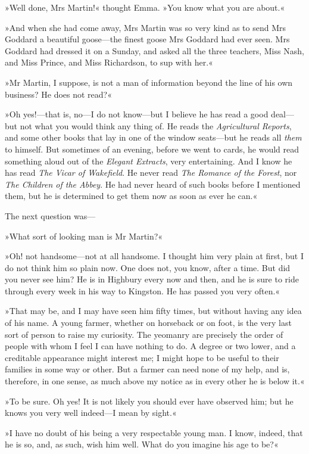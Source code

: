 »Well done, Mrs Martin!« thought Emma. »You know what you are about.«

»And when she had come away, Mrs Martin was so very kind as to send Mrs Goddard a beautiful goose—the finest goose Mrs Goddard had ever seen. Mrs Goddard had dressed it on a Sunday, and asked all the three teachers, Miss Nash, and Miss Prince, and Miss Richardson, to sup with her.«

»Mr Martin, I suppose, is not a man of information beyond the line of his own business? He does not read?«

»Oh yes!—that is, no—I do not know—but I believe he has read a good deal—but not what you would think any thing of. He reads the \textit{Agricultural Reports}, and some other books that lay in one of the window seats—but he reads all \textit{them} to himself. But sometimes of an evening, before we went to cards, he would read something aloud out of the \textit{Elegant Extracts}, very entertaining. And I know he has read \textit{The Vicar of Wakefield}. He never read \textit{The Romance of the Forest}, nor \textit{The Children of the Abbey}. He had never heard of such books before I mentioned them, but he is determined to get them now as soon as ever he can.«

The next question was—

»What sort of looking man is Mr Martin?«

»Oh! not handsome—not at all handsome. I thought him very plain at first, but I do not think him so plain now. One does not, you know, after a time. But did you never see him? He is in Highbury every now and then, and he is sure to ride through every week in his way to Kingston. He has passed you very often.«

»That may be, and I may have seen him fifty times, but without having any idea of his name. A young farmer, whether on horseback or on foot, is the very last sort of person to raise my curiosity. The yeomanry are precisely the order of people with whom I feel I can have nothing to do. A degree or two lower, and a creditable appearance might interest me; I might hope to be useful to their families in some way or other. But a farmer can need none of my help, and is, therefore, in one sense, as much above my notice as in every other he is below it.«

»To be sure. Oh yes! It is not likely you should ever have observed him; but he knows you very well indeed—I mean by sight.«

»I have no doubt of his being a very respectable young man. I know, indeed, that he is so, and, as such, wish him well. What do you imagine his age to be?«

